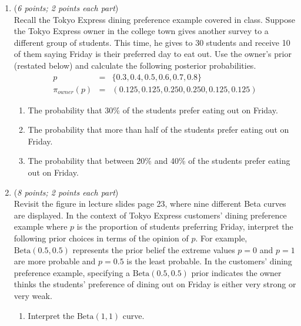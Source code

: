 \documentclass[11pt]{article}
\begin{document}
\begin{enumerate}


    \item 
    ({\it{6 points; 2 points each part}}) \\
    Recall the Tokyo Express dining preference example covered in class. Suppose the Tokyo Express owner in the college town gives another survey to a different group of students. This time, he gives to 30 students and receive 10 of them saying Friday is their preferred day to eat out. Use the owner's prior (restated below) and calculate the following posterior probabilities.
\begin{eqnarray}
p &=& \{0.3, 0.4, 0.5, 0.6, 0.7, 0.8\} \nonumber \\
\pi_{owner}(p) &=& (0.125, 0.125, 0.250, 0.250, 0.125, 0.125) \nonumber
\end{eqnarray}
\begin{enumerate}

\item The probability that 30\% of the students prefer eating out on Friday.

\item The probability that more than half of the students prefer eating out on Friday.

\item The probability that between 20\% and 40\% of the students prefer eating out on Friday.

\end{enumerate}



    \item
    ({\it{8 points; 2 points each part}}) \\
     Revisit the figure in lecture slides page 23, where nine different Beta curves are displayed.  In the context of Tokyo Express customers' dining preference example where $p$ is the proportion of students preferring Friday, interpret the following prior choices in terms of the opinion of $p$. For example, $\textrm{Beta}(0.5, 0.5)$ represents the prior belief the extreme values  $p = 0$ and $p = 1$ are more probable and $p = 0.5$ is the least probable. In the customers' dining preference example, specifying a $\textrm{Beta}(0.5, 0.5)$ prior indicates the owner thinks the students' preference of dining out on Friday is either very strong or very weak.

\begin{enumerate}
\item  Interpret the $\textrm{Beta}(1, 1)$ curve.


\end{enumerate}
\end{enumerate}
\end{document}
